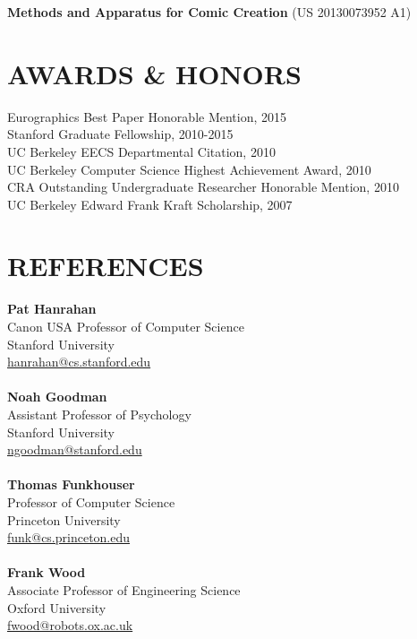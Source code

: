 \documentclass[line,margin]{res}
\begin{document}
\begin{resume}
\textbf{Methods and Apparatus for Comic Creation} (US 20130073952 A1)

\section{AWARDS \& HONORS}
Eurographics Best Paper Honorable Mention, 2015 \\
Stanford Graduate Fellowship, 2010-2015 \\ 
UC Berkeley EECS Departmental Citation, 2010 \\
UC Berkeley Computer Science Highest Achievement Award, 2010 \\
CRA Outstanding Undergraduate Researcher Honorable Mention, 2010 \\
UC Berkeley Edward Frank Kraft Scholarship, 2007 \\


\section{REFERENCES}

\textbf{Pat Hanrahan} \\
Canon USA Professor of Computer Science \\
Stanford University  \\
\url{hanrahan@cs.stanford.edu}
\\ \\
\textbf{Noah Goodman} \\
Assistant Professor of Psychology \\
Stanford University  \\
\url{ngoodman@stanford.edu}
\\ \\
\textbf{Thomas Funkhouser} \\
Professor of Computer Science \\
Princeton University  \\
\url{funk@cs.princeton.edu}
\\ \\
\textbf{Frank Wood} \\
Associate Professor of Engineering Science \\
Oxford University  \\
\url{fwood@robots.ox.ac.uk}

\end{resume}
\end{document}
